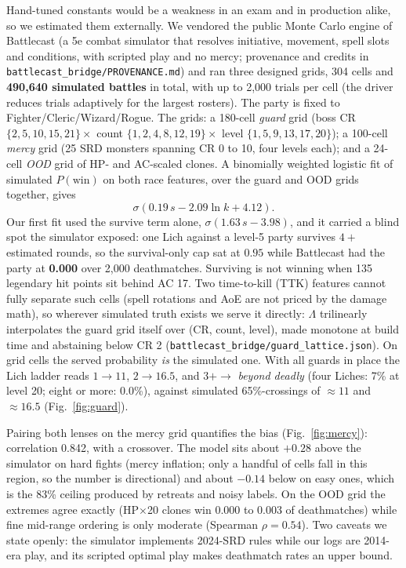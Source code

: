\documentclass[10pt]{article}
\newcommand{\code}[1]{\texttt{\small #1}}
\begin{document}
Hand-tuned constants would be a weakness in an exam and in production alike, so we
estimated them externally. We vendored the public Monte Carlo engine of Battlecast
(a 5e combat simulator that resolves initiative, movement, spell slots and
conditions, with scripted play and no mercy; provenance and credits in
\code{battlecast\_bridge/PROVENANCE.md}) and ran three designed grids, 304 cells
and \textbf{490{,}640 simulated battles} in total, with up to 2{,}000 trials per
cell (the driver reduces trials adaptively for the largest rosters). The party is
fixed to Fighter/Cleric/Wizard/Rogue. The grids: a 180-cell \emph{guard} grid (boss
CR $\{2,5,10,15,21\}\times$ count $\{1,2,4,8,12,19\}\times$ level
$\{1,5,9,13,17,20\}$); a 100-cell \emph{mercy} grid (25 SRD monsters spanning CR 0
to 10, four levels each); and a 24-cell \emph{OOD} grid of HP- and AC-scaled
clones. A binomially weighted logistic fit of simulated $P(\text{win})$ on both race
features, over the guard and OOD grids together, gives
\[
\sigma(0.19\, s - 2.09 \ln k + 4.12).
\]
Our first fit used the survive term alone, $\sigma(1.63\, s - 3.98)$, and it
carried a blind spot the simulator exposed: one Lich against a level-5 party
survives $4{+}$ estimated rounds, so the survival-only cap sat at $0.95$ while
Battlecast had the party at \textbf{0.000} over 2{,}000 deathmatches. Surviving is
not winning when 135 legendary hit points sit behind AC 17. Two time-to-kill (TTK) features
cannot fully separate such cells (spell rotations and AoE are not priced by the
damage math), so wherever simulated truth exists we serve it directly: $\Lambda$
trilinearly interpolates the guard grid itself over (CR, count, level), made
monotone at build time and abstaining below CR 2
(\code{battlecast\_bridge/guard\_lattice.json}). On grid cells the served
probability \emph{is} the simulated one. With all guards in place the Lich ladder
reads $1\to11$, $2\to16.5$, and $3{+}\to$ \emph{beyond deadly} (four Liches: 7\%
at level 20; eight or more: 0.0\%), against simulated 65\%-crossings of
${\approx}11$ and ${\approx}16.5$ (Fig.~\ref{fig:guard}).

Pairing both lenses on the mercy grid quantifies the bias (Fig.~\ref{fig:mercy}):
correlation 0.842, with a crossover. The model sits about ${+}0.28$ above the
simulator on hard fights (mercy inflation; only a handful of cells fall in this
region, so the number is directional) and about ${-}0.14$ below on easy ones,
which is the 83\% ceiling produced by retreats and noisy labels. On the OOD grid
the extremes agree exactly (HP$\times$20 clones win 0.000 to 0.003 of
deathmatches) while fine mid-range ordering is only moderate (Spearman
$\rho{=}0.54$). Two caveats we state openly: the simulator implements 2024-SRD
rules while our logs are 2014-era play, and its scripted optimal play makes
deathmatch rates an upper bound.
\end{document}
